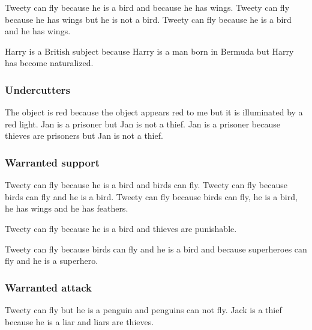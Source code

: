 \begin{exe}
\ex\label{e34} Tweety can fly because he is a bird and because he has wings.
\ex\label{e35} Tweety can fly because he has wings but he is not a bird.
\ex\label{e36} Tweety can fly because he is a bird and he has wings.
\end{exe}

\begin{exe}
\ex\label{e37} Harry is a British subject because Harry is a man born in Bermuda but Harry has become naturalized.
\end{exe}

\subsubsection{Undercutters}
\begin{exe}
\ex\label{e38} The object is red because the object appears red to me but it is illuminated by a red light.
\ex\label{e39} Jan is a prisoner but Jan is not a thief.
\ex\label{e40} Jan is a prisoner because thieves are prisoners but Jan is not a thief.
\end{exe}

\subsubsection{Warranted support}
\begin{exe}
\ex\label{e41} Tweety can fly because he is a bird and birds can fly.
\ex\label{e42} Tweety can fly because birds can fly and he is a bird.
\ex\label{e43} Tweety can fly because birds can fly, he is a bird, he has wings and he has feathers.
\end{exe}

\begin{exe}
\ex\label{e44} Tweety can fly because he is a bird and thieves are punishable.
\end{exe}

\begin{exe}
\ex\label{e45} Tweety can fly because birds can fly and he is a bird and because superheroes can fly and he is a superhero.
\end{exe}

\subsubsection{Warranted attack}
\begin{exe}
\ex\label{e46} Tweety can fly but he is a penguin and penguins can not fly.
\ex\label{e47} Jack is a thief because he is a liar and liars are thieves.
\end{exe}

